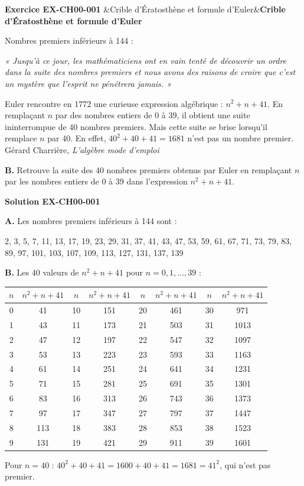 \documentclass[12pt, a4paper]{article}
\newcommand{\titrexercice}[2]{%
  \begin{mdframed}[
    backgroundcolor=vlmgray,
    linecolor=vlmblue,
    linewidth=1.5pt,
    innerleftmargin=10pt,
    innerrightmargin=10pt,
    innertopmargin=6pt,
    innerbottommargin=6pt,
    skipabove=1em,
    skipbelow=0.5em
  ]
  \textbf{\textcolor{vlmblue}{Exercice #1}}%
  \ifx&#2&\else\hfill\textbf{#2}\fi
  \end{mdframed}
}
\newenvironment{exercice}[2]{%
  \titrexercice{#1}{#2}
  \vspace{0.3em}
}{%
  \vspace{1em}
}
\newenvironment{solution}[1]{%
    \vspace{0.3em}
    \textbf{\textcolor{vlmgreen}{Solution #1}}
    \vspace{0.3em}\par
  }{%
    \vspace{1em}
  }
\newenvironment{solution}[1]{\comment}{\endcomment}
\begin{document}
\begin{exercice}{EX-CH00-001}{Crible d'Ératosthène et formule d'Euler}
\medskip
Nombres premiers inférieurs à 144 : \dotfill

\dotfill

\medskip
\textit{« Jusqu'à ce jour, les mathématiciens ont en vain tenté de découvrir un ordre dans la suite des nombres premiers et nous avons des raisons de croire que c'est un mystère que l'esprit ne pénétrera jamais. »}

\medskip
Euler rencontre en 1772 une curieuse expression algébrique : $n^2 + n + 41$. En remplaçant $n$ par des nombres entiers de 0 à 39, il obtient une suite ininterrompue de 40 nombres premiers. Mais cette suite se brise lorsqu'il remplace $n$ par 40. En effet, $40^2 + 40 + 41 = 1681$ n'est pas un nombre premier. \hfill{\small Gérard Charrière, \textit{L'algèbre mode d'emploi}}

\medskip
\textbf{B.} Retrouve la suite des 40 nombres premiers obtenus par Euler en remplaçant $n$ par les nombres entiers de 0 à 39 dans l'expression $n^2 + n + 41$.

\end{exercice}
\begin{solution}{EX-CH00-001}

\textbf{A.} Les nombres premiers inférieurs à 144 sont :

2, 3, 5, 7, 11, 13, 17, 19, 23, 29, 31, 37, 41, 43, 47, 53, 59, 61, 67, 71, 73, 79, 83, 89, 97, 101, 103, 107, 109, 113, 127, 131, 137, 139

\medskip
\textbf{B.} Les 40 valeurs de $n^2 + n + 41$ pour $n = 0, 1, \ldots, 39$ :

\medskip
\begin{tabular}{|c|c||c|c||c|c||c|c|}
\hline
$n$ & $n^2+n+41$ & $n$ & $n^2+n+41$ & $n$ & $n^2+n+41$ & $n$ & $n^2+n+41$ \\
\hline
0  & 41  & 10 & 151 & 20 & 461 & 30 & 971  \\
1  & 43  & 11 & 173 & 21 & 503 & 31 & 1013 \\
2  & 47  & 12 & 197 & 22 & 547 & 32 & 1097 \\
3  & 53  & 13 & 223 & 23 & 593 & 33 & 1163 \\
4  & 61  & 14 & 251 & 24 & 641 & 34 & 1231 \\
5  & 71  & 15 & 281 & 25 & 691 & 35 & 1301 \\
6  & 83  & 16 & 313 & 26 & 743 & 36 & 1373 \\
7  & 97  & 17 & 347 & 27 & 797 & 37 & 1447 \\
8  & 113 & 18 & 383 & 28 & 853 & 38 & 1523 \\
9  & 131 & 19 & 421 & 29 & 911 & 39 & 1601 \\
\hline
\end{tabular}

\medskip
Pour $n = 40$ : $40^2 + 40 + 41 = 1600 + 40 + 41 = 1681 = 41^2$, qui n'est pas premier.

\end{solution}
\end{document}
